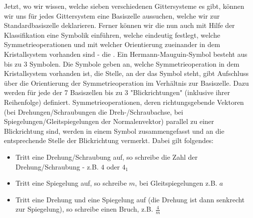 Jetzt, wo wir wissen, welche sieben verschiedenen Gittersysteme es gibt, können wir uns für jedes Gittersystem eine Basiszelle aussuchen, welche wir zur Standardbasiszelle deklarieren. Ferner können wir die nun auch mit Hilfe der Klassifikation eine Symbolik einführen, welche eindeutig festlegt, welche Symmetrieoperationen und mit welcher Orientierung zueinander in dem Kristallsystem vorhanden sind - die . Ein Hermann-Mauguin-Symbol besteht aus bis zu 3 Symbolen. Die Symbole geben an, welche Symmetrieoperation in dem Kristallsystem vorhanden ist, die Stelle, an der das Symbol steht, gibt Aufschluss über die Orientierung der Symmetrieoperation im Verhältnis zur Basiszelle. Dazu werden für jede der 7 Basiszellen bis zu 3 "Blickrichtungen" (inklusive ihrer Reihenfolge) definiert. Symmetrieoperationen, deren richtungsgebende Vektoren (bei Drehungen/Schraubungen die Dreh-/Schraubachse, bei Spiegelungen/Gleitspiegelungen der Normalenvektor) parallel zu einer  Blickrichtung sind, werden in einem Symbol zusammengefasst und an die entsprechende Stelle der Blickrichtung vermerkt. Dabei gilt folgendes:
\begin{itemize}
	\item Tritt eine Drehung/Schraubung auf, so schreibe die Zahl der Drehung/Schraubung - z.B. $4$ oder $4_1$
	\item Tritt eine Spiegelung auf, so schreibe $m$, bei Gleitspiegelungen z.B. $a$
	\item Tritt eine Drehung und eine Spiegelung auf (die Drehung ist dann senkrecht zur Spiegelung), so schreibe einen Bruch, z.B. $\frac{4}{m}$
\end{itemize}
